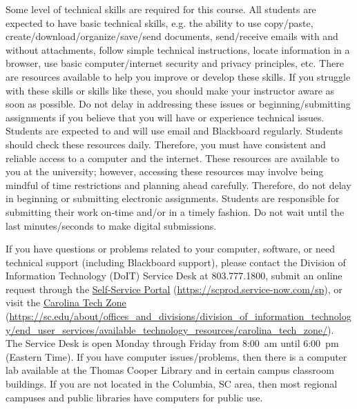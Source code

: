 \documentclass[11pt,letterpaper]{article}
\begin{document}
\newpage






Some level of technical skills are required for this course. All students are expected to have basic technical skills, e.g. the ability to use copy/paste, create/download/organize/save/send documents, send/receive emails with and without attachments, follow simple technical instructions, locate information in a browser, use basic computer/internet security and privacy principles, etc. There are resources available to help you improve or develop these skills. If you struggle with these skills or skills like these, you should make your instructor aware as soon as possible. Do not delay in addressing these issues or beginning/submitting assignments if you believe that you will have or experience technical issues. Students are expected to and will use email and Blackboard regularly. Students should check these resources daily. Therefore, you must have consistent and reliable access to a computer and the internet. These resources are available to you at the university; however, accessing these resources may involve being mindful of time restrictions and planning ahead carefully. Therefore, do not delay in beginning or submitting electronic assignments. Students are responsible for submitting their work on-time and/or in a timely fashion. Do not wait until the last minutes/seconds to make digital submissions. \pspace

If you have questions or problems related to your computer, software, or need technical support (including Blackboard support), please contact the Division of Information Technology (DoIT) Service Desk at 803.777.1800, submit an online request through the \href{https://scprod.service-now.com/sp}{Self-Service Portal} (\url{https://scprod.service-now.com/sp}), or visit the \href{https://sc.edu/about/offices\_and\_divisions/division\_of\_information\_technology/end\_user\_services/available\_technology\_resources/carolina\_tech\_zone/}{Carolina Tech Zone} (\url{https://sc.edu/about/offices\_and\_divisions/division\_of\_information\_technology/end\_user\_services/available\_technology\_resources/carolina\_tech\_zone/}). The Service Desk is open Monday through Friday from 8:00~am until 6:00~pm (Eastern Time). If you have computer issues/problems, then there is a computer lab available at the Thomas Cooper Library and in certain campus classroom buildings. If you are not located in the Columbia, SC area, then most regional campuses and public libraries have computers for public use. \pspace
\end{document}
